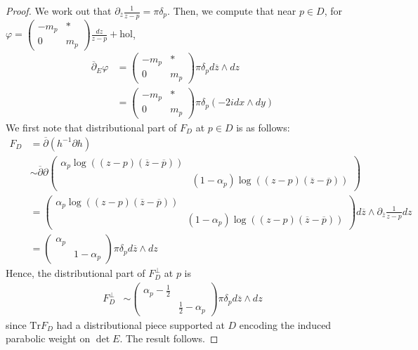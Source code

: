 \documentclass[12pt,letterpaper,reqno]{amsart}
\theoremstyle{remark}
\theoremstyle{definition}
\numberwithin{thm}{section}
\numberwithin{equation}{section}
\numberwithin{figure}{section}
\newcommand{\delbar}{\ensuremath{\overline{\partial}}}
\newcommand{\zbar}{{\ensuremath{\overline{z}}}}
\newcommand{\del}{{\partial}}
\begin{document}
\begin{proof}
We work out that $\partial_\zbar \frac{1}{z-p} =\pi \delta_p$.
Then, we compute that near $p \in D$,
for $\varphi= \begin{pmatrix}-m_p & * \\ 0 & m_p \end{pmatrix} \frac{dz}{z-p} + \mathrm{hol}$,
\begin{align*} \delbar_E \varphi &= \begin{pmatrix}-m_p & * \\ 0 & m_p \end{pmatrix} \pi \delta_p d\zbar \wedge d z \\
&= \begin{pmatrix}-m_p & * \\ 0 & m_p \end{pmatrix} \pi \delta_p(-2 i dx \wedge dy)
\end{align*}
We first note that distributional part of $F_D$ at $p \in D$ is as follows:
\begin{align*} F_D &= \delbar (h^{-1} \del h)\\
& \sim \delbar \del \begin{pmatrix} \alpha_p \log ((z-p) (\zbar-\overline{p})) & \\  & (1-\alpha_p)\log ((z-p)(\zbar-\overline{p})) \end{pmatrix}  \\
&= \begin{pmatrix} \alpha_p \log ((z-p)(\zbar-\overline{p})) & \\  & (1-\alpha_p)\log ((z-p)(\zbar-\overline{p})) \end{pmatrix}  d \zbar \wedge \del_{\zbar} \frac{1}{z-p} dz\\
&=  \begin{pmatrix} \alpha_p & \\ & 1-\alpha_p \end{pmatrix}   \pi \delta_p d \zbar \wedge d z
\end{align*}
Hence, the distributional part of $F_D^\perp$ at $p$ is 
\begin{align*}F_D^\perp &\sim \begin{pmatrix} \alpha_p- \frac{1}{2}& \\ & \frac{1}{2}-\alpha_p \end{pmatrix}   \pi \delta_p  d \zbar \wedge d z 
\end{align*}
since $\mathrm{Tr} F_D$ had a distributional piece supported at $D$ encoding the induced parabolic weight on $\det E$.
The result follows.
\end{proof}
\end{document}
